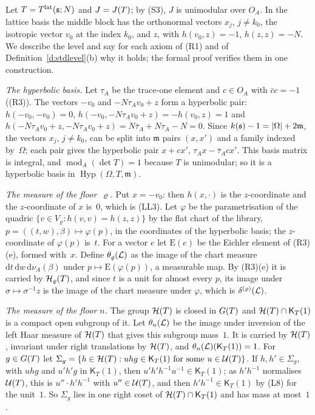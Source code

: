 \documentclass[11pt,a4paper]{article}
\makeatletter
\theoremstyle{plainx}
\theoremstyle{uprightx}
\renewenvironment{proof}[1][Proof]{\par\pushQED{\qed}\normalfont\topsep0pt\partopsep0pt
  \trivlist\item[\hskip\labelsep\itshape #1.]\ignorespaces}{\popQED\endtrivlist\@endpefalse}
\newcommand{\dd}{\mathrm{d}}
\newcommand{\modA}{\operatorname{mod}_A}              %
\newcommand{\quadric}[2]{\delta^{(#2)}(#1)}           %
\newcommand{\HypB}[3]{\operatorname{Hyp}(#1,#2,#3)}   %
\newcommand{\floorMeasure}[2]{\theta_{#2}(#1)}        %
\newcommand{\uLev}[2]{\mathsf{K}_{#2}(#1)}                     %
\newcommand{\Inp}[1]{\textup{(#1)}}
\makeatother
\begin{document}
\begin{proof}[Proof of Theorem E]
Let $T=T^{\mathrm{lat}}(\mathfrak{s};N)$ and $J=J(T)$; by \Inp{S3}, $J$ is unimodular over $O_A$. In the lattice basis the middle block
has the orthonormal vectors $x_j$, $j\ne k_0$, the isotropic vector $v_0$ at the index $k_0$, and $z$, with
$h(v_0,z)=-1$, $h(z,z)=-N$. We describe the level and say for each axiom of \Inp{R1} and of
Definition~\ref{d:stdlevel}(b) why it holds; the formal proof verifies them in one construction.

\emph{The hyperbolic basis.} Let $\tau_A$ be the trace-one element and $c\in O_A$ with $\bar cc=-1$ (\Inp{R3}). The
vectors $-v_0$ and $-N\tau_Av_0+z$ form a hyperbolic pair: $h(-v_0,-v_0)=0$,
$h(-v_0,-N\tau_Av_0+z)=-h(v_0,z)=1$ and
$h(-N\tau_Av_0+z,-N\tau_Av_0+z)=N\bar\tau_A+N\tau_A-N=0$. Since $k(\mathfrak{s})-1=|\Omega|+2\mathfrak{m}$, the vectors $x_j$,
$j\ne k_0$, can be split into $\mathfrak{m}$ pairs $(x,x')$ and a family indexed by~$\Omega$; each pair gives the
hyperbolic pair $x+cx'$, $\tau_Ax-\bar\tau_Acx'$. This basis matrix is integral, and $\modA(\det T)=1$ because $T$ is
unimodular; so it is a hyperbolic basis in $\HypB{\Omega}{T}{\mathfrak{m}}$.

\emph{The measure of the floor~$\varrho$.} Put $x=-v_0$: then $h(x,\cdot)$ is the $z$-coordinate and the
$z$-coordinate of $x$ is~$0$, which is (LL3). Let $\varphi$ be the parametrisation of the quadric
$\{v\in V_\varrho:h(v,v)=h(z,z)\}$ by the flat chart of the library, $p=((t,w),\beta)\mapsto\varphi(p)$, in the
coordinates of the hyperbolic basis; the $z$-coordinate of $\varphi(p)$ is~$t$. For a vector $e$ let $\mathrm{E}(e)$
be the Eichler element of \Inp{R3}(e), formed with~$x$. Define $\floorMeasure{\cL}{\varrho}$ as the image of the chart
measure $\dd t\,\dd w\,\dd\nu_A(\beta)$ under $p\mapsto\mathrm{E}(\varphi(p))$, a measurable map. By \Inp{R3}(e) it is
carried by $\mathcal{H}_{\varrho}(T)$, and since $t$ is a unit for almost every $p$, its image under $\sigma\mapsto\sigma^{-1}z$
is the image of the chart measure under $\varphi$, which is $\quadric{\cL}{\varrho}$.

\emph{The measure of the floor $n$.} The group $\mathcal{H}(T)$ is closed in $G(T)$ and $\HT{T}\cap\uLev{1}{T}$ is a compact
open subgroup of it. Let $\floorMeasure{\cL}{n}$ be the image under inversion of the left Haar measure of $\mathcal{H}(T)$ that
gives this subgroup mass~$1$. It is carried by $\mathcal{H}(T)$, invariant under right translations by $\mathcal{H}(T)$, and
$\floorMeasure{\cL}{n}(\uLev{1}{T})=1$. For $g\in G(T)$ let $\Sigma_g=\{h\in\HT{T}:uhg\in\uLev{1}{T}\text{ for some }u\in\UT{T}\}$.
If $h,h'\in\Sigma_g$, with $uhg$ and $u'h'g$ in $\uLev{1}{T}$, then $u'h'h^{-1}u^{-1}\in\uLev{1}{T}$; as $h'h^{-1}$
normalises $\mathcal{U}(T)$, this is $u''\cdot h'h^{-1}$ with $u''\in\mathcal{U}(T)$, and then $h'h^{-1}\in\uLev{1}{T}$ by \Inp{L8}
for the unit~$1$. So $\Sigma_g$ lies in one right coset of $\HT{T}\cap\uLev{1}{T}$ and has mass at most~$1$.


\end{proof}
\end{document}
